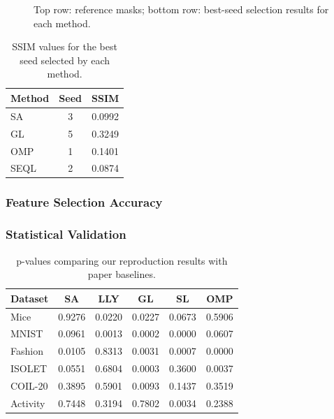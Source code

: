 \documentclass[a4paper,twocolumn]{article} %
\begin{document}
\begin{figure}[h!]
\begin{subfigure}[t]{0.19\linewidth}
    \end{subfigure}

    \caption{Top row: reference masks; bottom row: best-seed selection results for each method.}
    \label{fig:feature_masks}
\end{figure}


\begin{table}[ht]
    \centering
    \begin{tabular}{lcc}
        \hline
        \textbf{Method} & \textbf{Seed} & \textbf{SSIM} \\
        \hline
        SA    & 3 & 0.0992 \\
        GL    & 5 & 0.3249 \\
        OMP   & 1 & 0.1401 \\
        SEQL  & 2 & 0.0874 \\
        \hline
    \end{tabular}
    \caption{SSIM values for the best seed selected by each method.}
    \label{tab:ssim_results}
\end{table}


\subsubsection{Feature Selection Accuracy}
\subsubsection{Statistical Validation}
\begin{table}[ht]
\centering
\scriptsize
\begin{tabular}{lccccc}
\hline
\textbf{Dataset} & \textbf{SA} & \textbf{LLY} & \textbf{GL} & \textbf{SL} & \textbf{OMP} \\
\hline
Mice     & 0.9276 & 0.0220 & 0.0227 & 0.0673 & 0.5906 \\
MNIST    & 0.0961 & 0.0013 & 0.0002 & 0.0000 & 0.0607 \\
Fashion  & 0.0105 & 0.8313 & 0.0031 & 0.0007 & 0.0000 \\
ISOLET   & 0.0551 & 0.6804 & 0.0003 & 0.3600 & 0.0037 \\
COIL-20  & 0.3895 & 0.5901 & 0.0093 & 0.1437 & 0.3519 \\
Activity & 0.7448 & 0.3194 & 0.7802 & 0.0034 & 0.2388 \\
\hline
\end{tabular}
\caption{p-values comparing our reproduction results with paper baselines.}
\label{tab:pvalue-comparison}
\end{table}
\end{document}
